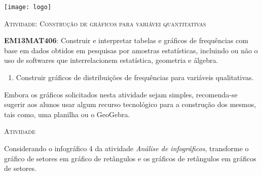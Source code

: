 \documentclass[10 pt,usenames,dvipsnames, oneside]{article}
\begin{document}
\begin{center}
  \begin{minipage}[l]{3cm}
\texttt{[image: logo]}    
\end{minipage}\hfill
\begin{minipage}[r]{.8\textwidth}
 {\Large \scshape Atividade: Construção de gráficos para variávei quantitativas}  
\end{minipage}
\end{center}
\vspace{.2cm}

\ifdefined\prof
\begin{objetivos}
\item \textbf{EM13MAT406}: Construir e interpretar tabelas e gráficos de frequências com base em dados obtidos em pesquisas por amostras estatísticas, incluindo ou não o uso de softwares que interrelacionem estatística, geometria e álgebra.
\end{objetivos}

\begin{goals}
\begin{enumerate}
\item Construir gráficos de distribuições de frequências para variáveis qualitativas.
\end{enumerate}

\tcblower

Embora os gráficos solicitados nesta atividade sejam simples, recomenda-se sugerir aos alunos usar algum recurso tecnológico para a construção dos mesmos, tais como, uma planilha ou o GeoGebra.

\end{goals}

\bigskip
\begin{center}
{\large \scshape Atividade}
\end{center}
\fi

Considerando o infográfico 4 da atividade \textit{Análise de infográficos}, transforme o gráfico de setores em gráfico de retângulos e os gráficos de retângulos em gráficos de setores.
\end{document}
